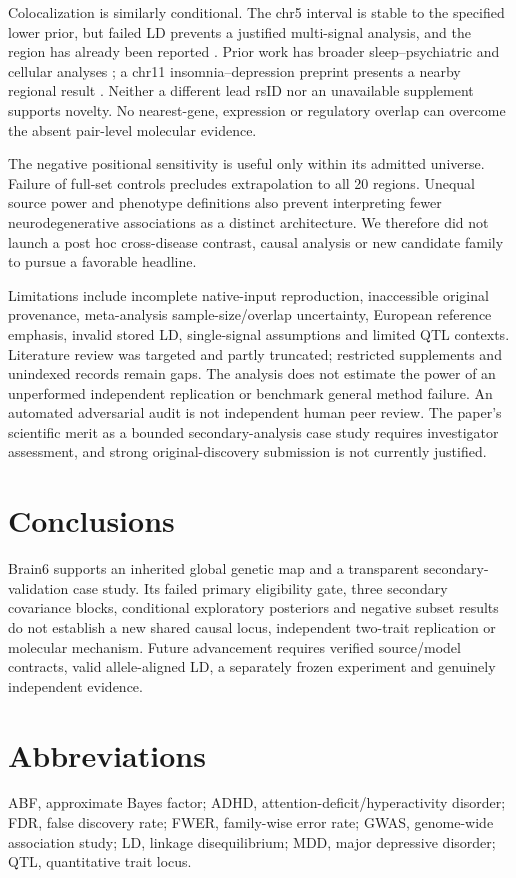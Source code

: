 \documentclass[11pt]{article}
\begin{document}
Colocalization is similarly conditional. The chr5 interval is stable to the specified lower prior, but failed LD prevents a justified multi-signal analysis, and the region has already been reported \cite{zu}. Prior work has broader sleep--psychiatric and cellular analyses \cite{jia,xue,lin}; a chr11 insomnia--depression preprint presents a nearby regional result \cite{schipper}. Neither a different lead rsID nor an unavailable supplement supports novelty. No nearest-gene, expression or regulatory overlap can overcome the absent pair-level molecular evidence.

The negative positional sensitivity is useful only within its admitted universe. Failure of full-set controls precludes extrapolation to all 20 regions. Unequal source power and phenotype definitions also prevent interpreting fewer neurodegenerative associations as a distinct architecture. We therefore did not launch a post hoc cross-disease contrast, causal analysis or new candidate family to pursue a favorable headline.

Limitations include incomplete native-input reproduction, inaccessible original provenance, meta-analysis sample-size/overlap uncertainty, European reference emphasis, invalid stored LD, single-signal assumptions and limited QTL contexts. Literature review was targeted and partly truncated; restricted supplements and unindexed records remain gaps. The analysis does not estimate the power of an unperformed independent replication or benchmark general method failure. An automated adversarial audit is not independent human peer review. The paper's scientific merit as a bounded secondary-analysis case study requires investigator assessment, and strong original-discovery submission is not currently justified.

\section*{Conclusions}
Brain6 supports an inherited global genetic map and a transparent secondary-validation case study. Its failed primary eligibility gate, three secondary covariance blocks, conditional exploratory posteriors and negative subset results do not establish a new shared causal locus, independent two-trait replication or molecular mechanism. Future advancement requires verified source/model contracts, valid allele-aligned LD, a separately frozen experiment and genuinely independent evidence.

\section*{Abbreviations}
ABF, approximate Bayes factor; ADHD, attention-deficit/hyperactivity disorder; FDR, false discovery rate; FWER, family-wise error rate; GWAS, genome-wide association study; LD, linkage disequilibrium; MDD, major depressive disorder; QTL, quantitative trait locus.
\end{document}
